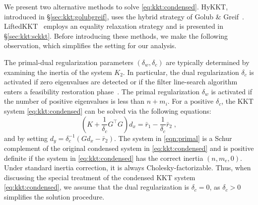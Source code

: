 \documentclass[smallextended]{svjour3}
\begin{document}
We present two alternative methods to solve \eqref{eq:kkt:condensed}.
HyKKT, introduced in \S\ref{sec:kkt:golubgreif}, uses the hybrid strategy of Golub \& Greif~\cite{golub2003solving,regev2023hykkt}.
LiftedKKT~\cite{shin2023accelerating} employs an equality relaxation strategy and is presented in \S\ref{sec:kkt:sckkt}.
Before introducing these methods, we make the following observation, which simplifies the setting for our analysis.
\begin{remark}
  \label{rmk:dualreg}
The primal-dual regularization parameters $(\delta_w,\delta_c)$ are typically determined by examining the inertia of the system $K_2$.
In particular, the dual regularization $\delta_c$ is activated if zero eigenvalues are detected or if the filter line-search algorithm enters a feasibility restoration phase~\cite[Section 3.3]{wachter2006implementation}. The primal regularization $\delta_w$ is activated if the number of positive eigenvalues is less than $n + m_i$. For a positive $\delta_c$, the KKT system \eqref{eq:kkt:condensed} can be solved via the following equations:
\begin{equation}\label{eqn:primal}
  \left( K + \frac{1}{\delta_c} G^\top G \right) d_x = \bar{r}_1 - \frac{1}{\delta_c} \bar{r}_2 \;,
\end{equation}
and by setting $d_y = \delta_c^{-1} (G d_x - \bar{r}_2)$. The system in
\eqref{eqn:primal} is a Schur complement of the original condensed system in
\eqref{eq:kkt:condensed} and is positive definite if the system in
\eqref{eq:kkt:condensed} has the correct inertia $(n, m_e, 0)$.
Under standard inertia correction, it is
always Cholesky-factorizable.
Thus, when discussing the special treatment of the condensed KKT system
\eqref{eq:kkt:condensed}, we assume that the dual regularization is $\delta_c
= 0$, as $\delta_c > 0$ simplifies the solution procedure.
\end{remark}
\end{document}
